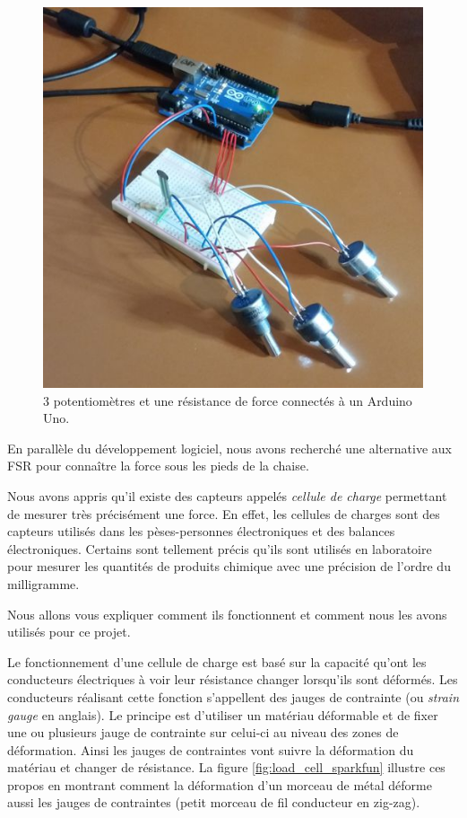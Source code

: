\documentclass{polytech/polytech}
\begin{document}
\begin{figure}[htbp]
\begin{center}
\includegraphics[scale=0.6]{image/Arduino_v0.jpg}
\end{center}
\caption{3 potentiomètres et une résistance de force connectés à un Arduino Uno.}
\label{fig:arduino_v0}
\end{figure}

En parallèle du développement logiciel, nous avons recherché une alternative aux FSR pour connaître la force sous les pieds de la chaise. 

Nous avons appris qu'il existe des capteurs appelés \textit{cellule de charge} permettant de mesurer très précisément une force. En effet, les cellules de charges sont des capteurs utilisés dans les pèses-personnes électroniques et des balances électroniques. Certains sont tellement précis qu'ils sont utilisés en laboratoire pour mesurer les quantités de produits chimique avec une précision de l'ordre du milligramme.

Nous allons vous expliquer comment ils fonctionnent et comment nous les avons utilisés pour ce projet.

Le fonctionnement d'une cellule de charge est basé sur la capacité qu'ont les conducteurs électriques à voir leur résistance changer lorsqu'ils sont déformés. Les conducteurs réalisant cette fonction s'appellent des jauges de contrainte (ou \textit{strain gauge} en anglais). Le principe est d'utiliser un matériau déformable et de fixer une ou plusieurs jauge de contrainte sur celui-ci au niveau des zones de déformation. Ainsi les jauges de contraintes vont suivre la déformation du matériau et changer de résistance. La figure \ref{fig:load_cell_sparkfun} illustre ces propos en montrant comment la déformation d'un morceau de métal déforme aussi les jauges de contraintes (petit morceau de fil conducteur en zig-zag).
\end{document}
